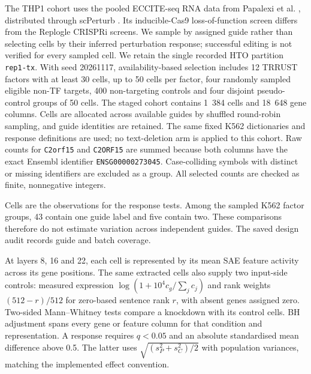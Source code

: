 \documentclass[review,authoryear,12pt]{elsarticle}
\begin{document}
The THP1 cohort uses the pooled ECCITE-seq RNA data from Papalexi et al.
\citep{refPapalexi}, distributed through scPerturb \citep{refScPerturb}. Its inducible-Cas9
loss-of-function screen differs from the Replogle CRISPRi screens. We sample by assigned guide
rather than selecting cells by their inferred perturbation response; successful editing is not
verified for every sampled cell. We retain the single
recorded HTO partition \texttt{rep1-tx}. With seed 20261117, availability-based selection includes
12 TRRUST factors with at least 30 cells, up to 50 cells per factor, four randomly sampled eligible
non-TF targets, 400 non-targeting controls and four disjoint pseudo-control groups of 50 cells.
The staged cohort contains 1~384 cells and 18~648 gene columns. Cells are allocated across available
guides by shuffled round-robin sampling, and guide identities are retained. The same fixed K562
dictionaries and response definitions are used; no text-deletion arm is applied to this cohort.
Raw counts for \texttt{C2orf15} and \texttt{C2ORF15} are summed because both columns have the exact
Ensembl identifier \texttt{ENSG00000273045}. Case-colliding symbols with distinct or missing
identifiers are excluded as a group. All selected counts are checked as finite, nonnegative integers.

Cells are the observations for the response tests. Among the sampled K562 factor groups,
43 contain one guide label and five contain two. These comparisons therefore do not estimate
variation across independent guides. The saved design audit records guide and batch coverage.

At layers 8, 16 and 22, each cell is represented by its mean SAE feature activity across its gene
positions. The same extracted cells also supply two input-side controls: measured expression
$\log(1+10^4c_g/\sum_jc_j)$ and rank weights $(512-r)/512$ for zero-based sentence rank $r$,
with absent genes assigned zero. Two-sided Mann--Whitney tests compare a knockdown with its control
cells. BH adjustment spans every gene or feature column for that condition and representation.
A response requires $q<0.05$ and an absolute standardised mean difference above 0.5. The latter uses
$\sqrt{(s_P^2+s_C^2)/2}$ with population variances, matching the implemented effect convention.
\end{document}
